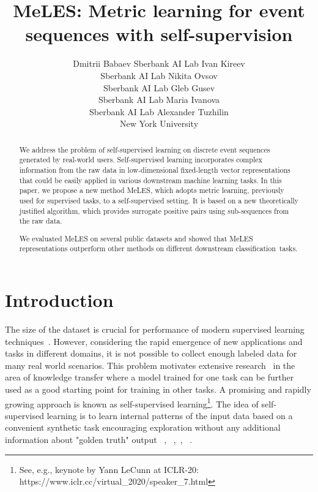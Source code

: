 \documentclass{article}
\title{MeLES: Metric learning for event sequences with self-supervision}
\author{
Dmitrii Babaev
Sberbank AI Lab
\And
Ivan Kireev \\
Sberbank AI Lab
\And
Nikita Ovsov \\
Sberbank AI Lab
\And
Gleb Gusev \\
Sberbank AI Lab
\And
Maria Ivanova \\
Sberbank AI Lab
\And
Alexander Tuzhilin \\
New York University
}
\begin{document}
\maketitle

\begin{abstract}

We address the problem of self-supervised learning on discrete event sequences generated by real-world users. Self-supervised learning incorporates complex information from the raw data in low-dimensional fixed-length vector representations that could be easily applied in various downstream machine learning tasks. In this paper, we propose a new method MeLES, which adopts metric learning, previously used for supervised tasks, to a self-supervised setting. It is based on a new theoretically justified algorithm, which provides surrogate positive pairs using sub-sequences from the raw data.

We evaluated MeLES on several public datasets and showed that MeLES representations outperform other methods on different downstream classification~tasks.

\end{abstract}

\section{Introduction} \label{sec-intro}

The size of the dataset is crucial for performance of modern supervised learning techniques~\cite{Sun2017RevisitingUE}. However, considering the rapid emergence of new applications and tasks in different domains, it is not possible to collect enough labeled data for many real world scenarios. This problem motivates extensive research~\cite{Tan2018ASO, Pan2010ASO} in the area of knowledge transfer where a model trained for one task can be further used as a good starting point for training in other tasks. A promising and rapidly growing approach is known as self-supervised learning\footnote{See, e.g., keynote by Yann LeCunn at ICLR-20: https://www.iclr.cc/virtual\_2020/speaker\_7.html}. The idea of self-supervised learning is to learn internal patterns of the input data based on a convenient synthetic task encouraging exploration without any additional information about "golden truth" output ~\cite{Peters2018DeepCW}, ~\cite{Devlin2019BERTPO},~\cite{Doersch2015UnsupervisedVR}, ~\cite{Oord2018RepresentationLW}. 
\end{document}
